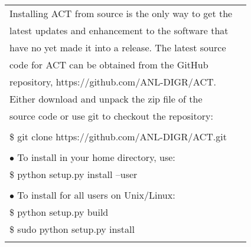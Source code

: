 \documentclass[potrait, z1paper, fontscale=0.33]{baposter} %
\begin{document}
\begin{poster}
{\begin{flushleft}
\begin{tabular}{@{}ll@{}}
Installing ACT from source is the only way to get the\\
latest updates and enhancement to the software that\\
have no yet made it into a release. The latest source\\
code for ACT can be obtained from the GitHub\\
repository, https://github.com/ANL-DIGR/ACT.\\
Either download and unpack the zip file of the\\
source code or use git to checkout the repository:\\
\\
\-\hspace{0.1cm} \$ git clone https://github.com/ANL-DIGR/ACT.git\\
\\
\-\hspace{0.1cm} $\bullet$ To install in your home directory, use:\\
\-\hspace{0.1cm} \$ python setup.py install --user\\
\\
\-\hspace{0.1cm} $\bullet$ To install for all users on Unix/Linux:\\
\-\hspace{0.1cm} \$ python setup.py build\\
\-\hspace{0.1cm} \$ sudo python setup.py install\\
\\

\end{tabular}
\end{flushleft}
}



\end{poster}
\end{document}
